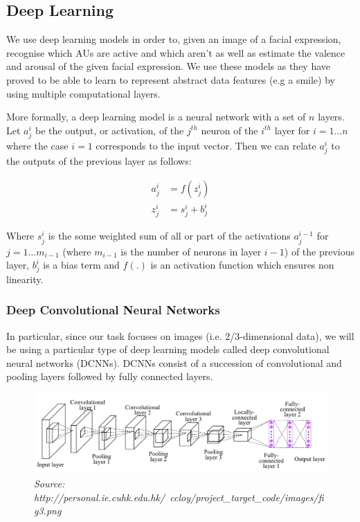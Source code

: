 \documentclass[12pt,twoside]{article}
\newcommand{\source}[1]{\vspace{-3pt} \caption*{ \footnotesize{\textit{Source: {#1}}}} }
\begin{document}
\subsection{Deep Learning}

We use deep learning models in order to, given an image of a facial expression,
recognise which AUs are active and which aren't as well as estimate the valence and
arousal of the given facial expression. We use these models as they have proved
to be able to learn to represent abstract data features (e.g a smile) by using
multiple computational layers.

More formally, a deep learning model is a neural network with a set of
$n$ layers. Let $a_j^i$ be the output, or activation, of the $j^{th}$ neuron of
the $i^{th}$ layer for $i = 1 \dots n$ where the case $i=1$ corresponds to the
input vector. Then we can relate $a_j^i$ to the outputs of the previous layer
as follows:

\begin{align}
  a_j^i &= f\left( z_j^i  \right)\\
  z_j^i &= s_j^i + b_j^i 
  \label{eq:NN}
\end{align}

Where $s_j^i$ is the some weighted sum of all or part of the activations
$a_j^{i-1}$ for $j = 1 \dots m_{i-1}$ (where $m_{i-1}$ is the number of
neurons in layer $i-1$) of the previous layer, $b_j^i$ is a bias term and
$f(.)$ is an activation function which ensures non linearity.

\subsubsection{Deep Convolutional Neural Networks}

In particular, since our task focuses on images (i.e. 2/3-dimensional data), we
will be using a particular type of deep learning models called deep
convolutional neural networks (DCNNs). DCNNs consist of a succession of 
convolutional and pooling layers followed by fully connected layers.

\begin{figure}[ht]
  \centering
  \includegraphics[scale=0.8]{figures/cnn.png}
  \caption{example of a DCNN architecture with a succession of convolutional +
  max pooling layers followed by a bloc of fully connected layers}
  \source{http://personal.ie.cuhk.edu.hk/~ccloy/project\_target\_code/images/fig3.png}
  \label{fig:cnn}
\end{figure}
\end{document}
